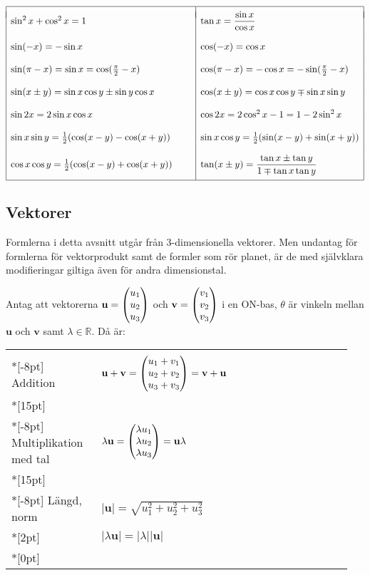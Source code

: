 \documentclass[a4paper]{article}
\def\trevektor[#1,#2,#3]{\begin{pmatrix}#1\cr #2\cr #3\end{pmatrix}}
\def\abs#1{|#1|}
\def\vec#1{\mathbf #1} %
\begin{document}
\begin{equation*}
  \begin{array}{|l|l|}
    \hline 
    &\\*[-7pt]
    \sin^2x+\cos^2x=1  &\tan x=\dfrac{\sin x}{\cos x}\\ 
    & \\ 
    \sin(-x)=-\sin x &\cos(-x)=\cos x \\ 
    & \\ 
    \sin(\pi-x)=\sin x=\cos(\frac{\pi}{2}-x) &
    \cos(\pi-x)=-\cos x=-\sin(\frac{\pi}{2}-x) \\ 
    & \\ 
    \sin(x\pm y)=\sin x\cos y\pm\sin y\cos x &
    \cos(x\pm y)=\cos x\cos y\mp\sin x\sin y \\ 
    & \\ 
    \sin 2x=2\sin x\cos x&\cos 2x=2\cos^2x-1=1-2\sin^2x \\ 
    & \\
    \sin x\sin y=\frac{1}{2}(\cos(x-y)-\cos(x+y))
    &\sin x\cos y=\frac{1}{2}(\sin(x-y)+\sin(x+y)) \\
    & \\
    \cos x\cos y=\frac{1}{2}(\cos(x-y)+\cos(x+y))\hspace{7 mm}
    &\tan(x\pm y)=\dfrac{\tan x\pm\tan y}{1\mp\tan x\tan y}\\*[10pt]
    \hline
  \end{array} 
\end{equation*}

\subsection*{Vektorer}

Formlerna i detta avsnitt utgår från 3-dimensionella vektorer. Men
undantag för formlerna för vektorprodukt samt de formler som rör
planet, är de med självklara modifieringar giltiga även för andra
dimensionstal. 

\bigskip
Antag att vektorerna $\vec u=\trevektor[u_1,u_2,u_3]$ och $\vec
v=\trevektor[v_1,v_2,v_3]$ i en ON-bas, $\theta$ är vinkeln mellan
$\vec u$ och $\vec v$ samt $\lambda\in\mathbb R$. Då är:

\bigskip
\begin{tabular}{|p{0.25\linewidth}|p{0.7\linewidth}|}
  \hline &\\*[-8pt]
  Addition &
  $\vec u+\vec v=\trevektor[u_1+v_1,u_2+v_2,u_3+v_3]=\vec v + \vec u$
  \\*[15pt] \hline &\\*[-8pt]
  Multiplikation med tal&
  $\lambda\vec u=\trevektor[\lambda u_1,\lambda u_2,\lambda u_3] = \vec u\lambda$
  \\*[15pt] \hline &\\*[-8pt]
  Längd, norm
  &
  $\abs{\vec u}=\sqrt{u_1^2+u_2^2+u_3^2}$\\*[2pt]
  &$\abs{\lambda\vec u}=\abs \lambda\abs{\vec u}$\\*[0pt]
  \hline
\end{tabular}
\end{document}
